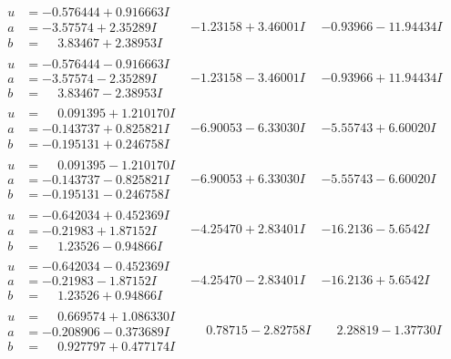 \documentclass[1p]{elsarticle_modified}
\theoremstyle{definition}
\begin{document}
$$\begin{array}{c|c|c}
\begin{aligned}
u &= -0.576444 + 0.916663 I \\
a &= -3.57574 + 2.35289 I \\
b &= \phantom{-}3.83467 + 2.38953 I\end{aligned}
 & -1.23158 + 3.46001 I & -0.93966 - 11.94434 I \\ \hline\begin{aligned}
u &= -0.576444 - 0.916663 I \\
a &= -3.57574 - 2.35289 I \\
b &= \phantom{-}3.83467 - 2.38953 I\end{aligned}
 & -1.23158 - 3.46001 I & -0.93966 + 11.94434 I \\ \hline\begin{aligned}
u &= \phantom{-}0.091395 + 1.210170 I \\
a &= -0.143737 + 0.825821 I \\
b &= -0.195131 + 0.246758 I\end{aligned}
 & -6.90053 - 6.33030 I & -5.55743 + 6.60020 I \\ \hline\begin{aligned}
u &= \phantom{-}0.091395 - 1.210170 I \\
a &= -0.143737 - 0.825821 I \\
b &= -0.195131 - 0.246758 I\end{aligned}
 & -6.90053 + 6.33030 I & -5.55743 - 6.60020 I \\ \hline\begin{aligned}
u &= -0.642034 + 0.452369 I \\
a &= -0.21983 + 1.87152 I \\
b &= \phantom{-}1.23526 - 0.94866 I\end{aligned}
 & -4.25470 + 2.83401 I & -16.2136 - 5.6542 I \\ \hline\begin{aligned}
u &= -0.642034 - 0.452369 I \\
a &= -0.21983 - 1.87152 I \\
b &= \phantom{-}1.23526 + 0.94866 I\end{aligned}
 & -4.25470 - 2.83401 I & -16.2136 + 5.6542 I \\ \hline\begin{aligned}
u &= \phantom{-}0.669574 + 1.086330 I \\
a &= -0.208906 - 0.373689 I \\
b &= \phantom{-}0.927797 + 0.477174 I\end{aligned}
 & \phantom{-}0.78715 - 2.82758 I & \phantom{-}2.28819 - 1.37730 I \\ \hline\begin{aligned}

\end{aligned}
\end{array}$$
\end{document}
